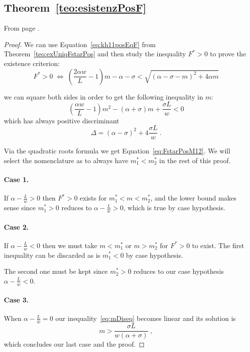 \subsection{ Theorem~\ref{teo:esistenzPosF} }
From page \pageref{teo:esistenzPosF}.

\begin{proof}
We can use Equation~\eqref{eq:kh11posEqF} from Theorem~\ref{teo:exUniqFstarPos} and then study the
inequality $F^* >0$ to prove the existence criterion:
$$F^* > 0 \; \iff \;
\left( \frac{2 \alpha w}{L} -1 \right) m - \alpha - \sigma < \sqrt{ {(\alpha - \sigma -m)}^2 + 4 \alpha m }$$

we can square both sides in order to get the following inequality in $m$:
\begin{equation}
    \left( \frac{\alpha w}{L} -1 \right) m^2 -( \alpha + \sigma) m + \frac{\sigma L}{w} < 0
    \label{eq:mDiseq}
\end{equation}
which has always positive discriminant
$$\Delta = {(\alpha -\sigma)}^2 +4 \frac{\sigma L}{w} \; .$$

Via the quadratic roots formula we get Equation~\eqref{eq:FstarPosM12}.
We will select the nomenclature as to always have $m_1^* < m_2^*$ in the rest of this proof.

\paragraph{Case 1.}
If $\alpha - \frac{L}{w} >0$ then $F^*>0$ exists for $m_1^* < m < m_2^*$, and the lower bound makes sense since
$m_1^* > 0$ reduces to $\alpha - \frac{L}{w}>0$, which is true by case hypothesis.

\paragraph{Case 2.}
If $\alpha -\frac{L}{w} <0$ then we must take $m < m_1^*$ or $m > m_2^*$ for $F^* >0$ to exist.
The first inequality can be discarded as is $m_1^* <0$ by case hypothesis.

The second one must be kept since $m_2^* >0$ reduces to our case hypothesis $\alpha - \frac{L}{w} < 0$.

\paragraph{Case 3.}
When $\alpha - \frac{L}{w} =0$ our inequality~\eqref{eq:mDiseq} becomes linear and its solution is
$$m > \frac{\sigma L}{w (\alpha +\sigma)} \; ,$$
which concludes our last case and the proof.
\end{proof}


